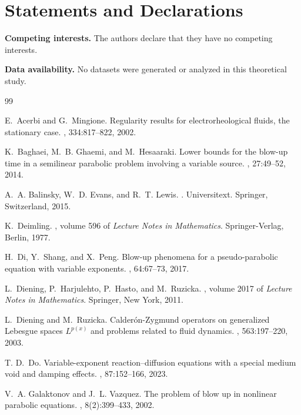 \documentclass[12pt,reqno]{amsart}
\theoremstyle{definition}
\theoremstyle{remark}
\numberwithin{equation}{section}
\begin{document}
\section*{Statements and Declarations}


\textbf{Competing interests.} The authors declare that they have no competing interests.

\textbf{Data availability.} No datasets were generated or analyzed in this theoretical study.



\begin{thebibliography}{99}
	
E.~Acerbi and G.~Mingione.
\newblock Regularity results for electrorheological fluids, the stationary
case.
, 334:817--822, 2002.

K.~Baghaei, M.~B. Ghaemi, and M.~Hesaaraki.
\newblock Lower bounds for the blow-up time in a semilinear parabolic problem
involving a variable source.
, 27:49--52, 2014.

A.~A. Balinsky, W.~D. Evans, and R.~T. Lewis.
.
\newblock Universitext. Springer, Switzerland, 2015.


K.~Deimling.
, volume 596 of {\em Lecture Notes in Mathematics}.
\newblock Springer-Verlag, Berlin, 1977.

H.~Di, Y.~Shang, and X.~Peng.
\newblock Blow-up phenomena for a pseudo-parabolic equation with variable
exponents.
, 64:67--73, 2017.

L.~Diening, P.~Harjulehto, P.~Hasto, and M.~Ruzicka.
, volume
2017 of {\em Lecture Notes in Mathematics}.
\newblock Springer, New York, 2011.

L.~Diening and M.~Ruzicka.
\newblock Calder\'on-Zygmund operators on generalized Lebesgue spaces $L^{p(x)}$
and problems related to fluid dynamics.
, 563:197--220, 2003.

 T. D.~Do. 
\newblock Variable-exponent reaction–diffusion equations with a special
medium void and damping effects. 
, 87:152--166, 2023.

V.~A. Galaktonov and J.~L. Vazquez.
\newblock The problem of blow up in nonlinear parabolic equations.
, 8(2):399--433, 2002.


\end{thebibliography}
\end{document}

